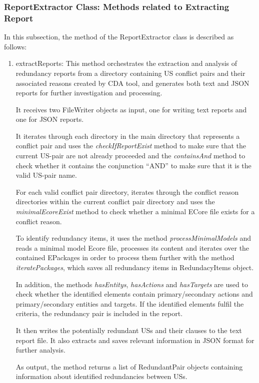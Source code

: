 \subsubsection*{ReportExtractor Class: Methods related to Extracting Report}
In this subsection, the method of the ReportExtractor class is described as follows:
\begin{enumerate}
	\item extractReports: This method orchestrates the extraction and analysis of redundancy reports from a directory containing US conflict pairs and their associated reasons created by CDA tool, and generates both text and JSON reports for further investigation and processing.
	
	It receives two FileWriter objects as input, one for writing text reports and one for JSON reports.
	
	It iterates through each directory in the main directory that represents a conflict pair and uses the \textit{checkIfReportExist} method to make sure that the current US-pair are not already proceeded and the \textit{containsAnd} method to check whether it contains the conjunction \enquote{AND} to make sure that it is the valid US-pair name.
	
	For each valid conflict pair directory, iterates through the conflict reason directories within the current conflict pair directory and uses the \textit{minimalEcoreExist} method to check whether a minimal ECore file exists for a conflict reason.
	
	To identify redundancy items, it uses the method \textit{processMinimalModels} and reads a minimal model Ecore file, processes its content and iterates over the contained EPackages in order to process them further with the method \textit{iteratePackages}, which saves all redundancy items in RedundacyItems object.
	
	In addition, the methods \textit{hasEntitys}, \textit{hasActions} and \textit{hasTargets} are used to check whether the identified elements contain primary/secondary actions and primary/secondary entities and targets. If the identified elements fulfil the criteria, the redundancy pair is included in the report.
	
	It then writes the potentially redundant USs and their clauses to the text report file. It also extracts and saves relevant information in JSON format for further analysis.
	
	As output, the method returns a list of RedundantPair objects containing information about identified redundancies between USs.
	

\end{enumerate}
